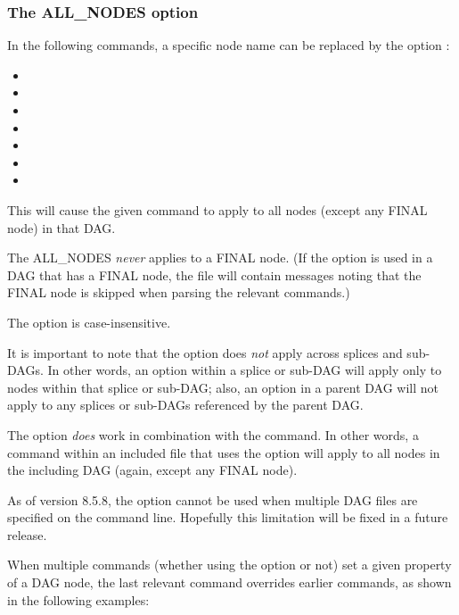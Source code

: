 \subsubsection{\label{sec:DAGAllNodes}The ALL\_NODES option}

In the following commands, a specific node name can be replaced by
the option :
\begin{itemize}
\item {}
\item {}
\item {}
\item {}
\item {}
\item {}
\item {}
\end{itemize}

This will cause the given command to apply to all nodes (except any
FINAL node) in that DAG.

The ALL\_NODES \emph{never} applies to a FINAL node.  (If the
 option is used in a DAG that has a FINAL node, the
 file will contain messages noting that the FINAL
node is skipped when parsing the relevant commands.)

The  option is case-insensitive.

It is important to note that the  option does \emph{not}
apply across splices and sub-DAGs.  In other words, an 
option within a splice or sub-DAG will apply only to nodes within
that splice or sub-DAG; also, an  option in a parent
DAG will not apply to any splices or sub-DAGs referenced by the
parent DAG.

The  option \emph{does} work in combination with the
 command.  In other words, a command within an included
file that uses the  option will apply to all nodes
in the including DAG (again, except any FINAL node).

As of version 8.5.8, the  option cannot be used when
multiple DAG files are specified on the  command
line.  Hopefully this limitation will be fixed in a future release.

When multiple commands (whether using the  option or not)
set a given property of a DAG node, the last relevant command overrides
earlier commands, as shown in the following examples:

